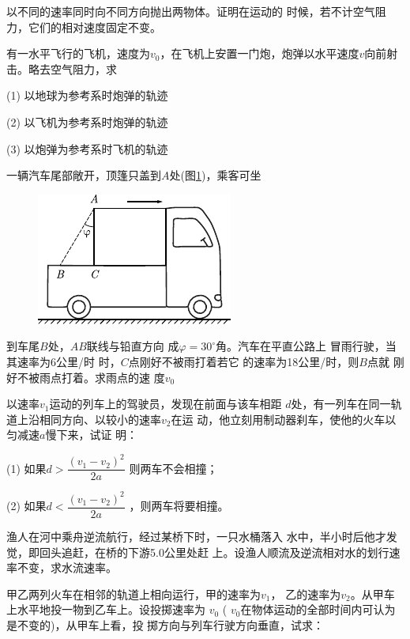 \begin{exercises}

\exercise 以不同的速率同时向不同方向抛出两物体。证明在运动的
时候，若不计空气阻力，它们的相对速度固定不变。

\exercise 有一水平飞行的飞机，速度为$ v _ { 0 }$，在飞机上安置一门炮，炮弹以水平速度$ v $向前射击。略去空气阻力，求

(1) 以地球为参考系时炮弹的轨迹

(2) 以飞机为参考系时炮弹的轨迹

(3) 以炮弹为参考系时飞机的轨迹

\exercise 一辆汽车尾部敞开，顶篷只盖到$A$处(图\ref{fig:02.17})，乘客可坐
\begin{figure}
    \includegraphics{figure/fig02.17}
    \caption{}
    \label{fig:02.17}
\end{figure}
到车尾$B$处，$AB$联线与铅直方向
成$ \varphi = 3 0 ^ { \circ }  $角。汽车在平直公路上
冒雨行驶，当其速率为6公里/时
时，$C$点刚好不被雨打着若它
的速率为18公里/时，则$B$点就
刚好不被雨点打着。求雨点的速
度$ v _ { 0 }$

\exercise 以速率$ v _ { 1 }  $运动的列车上的驾驶员，发现在前面与该车相距
$d$处，有一列车在同一轨道上沿相同方向、以较小的速率$v_2$在运
动，他立刻用制动器刹车，使他的火车以匀减速$a$慢下来，试证
明：

(1) 如果$d > \dfrac { \left( v _ { 1 } - v _ { 2 } \right) ^ { 2 } } { 2 a }$
则两车不会相撞；

(2) 如果$d < \dfrac { \left( v _ { 1 } - v _ { 2 } \right) ^ { 2 } } { 2 a }$
，则两车将要相撞。

\exercise 渔人在河中乘舟逆流航行，经过某桥下时，一只水桶落入
水中，半小时后他才发觉，即回头追赶，在桥的下游5.0公里处赶
上。设渔人顺流及逆流相对水的划行速率不变，求水流速率。

\exercise 甲乙两列火车在相邻的轨道上相向运行，甲的速率为$v_1$，
乙的速率为$v_2$。从甲车上水平地投一物到乙车上。设投掷速率为
$v _ { 0 }$ \left( $v_0  $在物体运动的全部时间内可认为是不变的)，从甲车上看，投
掷方向与列车行驶方向垂直，试求：


\end{exercises}
